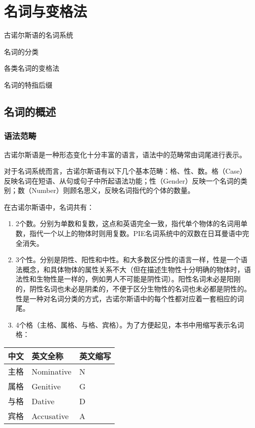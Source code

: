 \chapter{名词与变格法}
\label{名词与变格法}

\begin{introduction}[章节要点]
  \item 古诺尔斯语的名词系统
  \item 名词的分类
  \item 各类名词的变格法
  \item 名词的特指后缀
\end{introduction}

\section{名词的概述}
\label{名词的概述}
\subsection{语法范畴}
古诺尔斯语是一种形态变化十分丰富的语言，语法中的范畴常由词尾进行表示。

对于名词系统而言，古诺尔斯语有以下几个基本范畴：格、性、数。格（Case）反映名词在短语、从句或句子中所起语法功能；性（Gender）反映一个名词的类别；数（Number）则顾名思义，反映名词指代的个体的数量。

在古诺尔斯语中，名词共有：

\begin{enumerate}

  \item
        2个数。分别为单数和复数，这点和英语完全一致，指代单个物体的名词用单数，指代一个以上的物体时则用复数。PIE名词系统中的双数在日耳曼语中完全消失。
  \item
        3个性。分别是阴性、阳性和中性。和大多数区分性的语言一样，性是一个语法概念，和具体物体的属性关系不大（但在描述生物性十分明确的物体时，语法性和生物性是一样的，例如男人不可能是阴性词）。阳性名词未必是阳刚的，阴性名词也未必是阴柔的，不便于区分生物性的名词也未必都是阴性的。性是一种对名词分类的方式，古诺尔斯语中的每个性都对应着一套相应的词尾。
  \item
        4个格（主格、属格、与格、宾格）。为了方便起见，本书中用缩写表示名词格：
\end{enumerate}

\begin{longtable}{lll}
  \toprule
  \textbf{中文} & \textbf{英文全称} & \textbf{英文缩写} \\
  \midrule
  \endhead
  \bottomrule
  \endfoot
  主格          & Nominative        & N                 \\
  属格          & Genitive          & G                 \\
  与格          & Dative            & D                 \\
  宾格          & Accusative        & A                 \\
\end{longtable}

